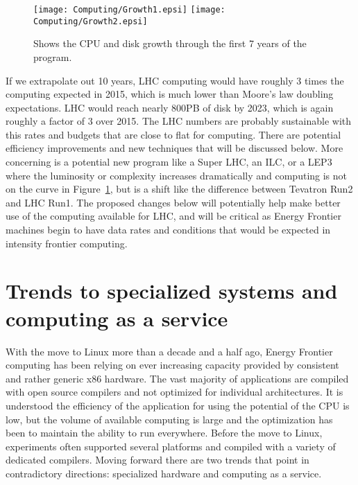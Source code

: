 \begin{figure}[htb]
\begin{center}
\texttt{[image: Computing/Growth1.epsi]}
\texttt{[image: Computing/Growth2.epsi]}
\caption{Shows the CPU and disk growth through the first 7 years of the program.}
\label{fig:growth}
\end{center}
\end{figure}



If we extrapolate out 10 years, LHC computing would have roughly 3 times the computing expected in 2015, 
which is much lower than Moore's law doubling expectations.    LHC would reach nearly 800PB of disk by 2023, 
which is again roughly a factor of 3 over 2015.    The LHC numbers are probably sustainable with this rates 
and budgets that are close to flat for computing.   There are potential efficiency improvements and new 
techniques that will be discussed below.    More concerning is a potential new program like a Super LHC, an ILC, or a 
LEP3 where the luminosity or complexity increases dramatically and computing is not on the curve in Figure~\ref{fig:growth},
 but is a shift like the difference between Tevatron Run2 and LHC Run1.    The proposed changes below will 
potentially help make better use of the computing available for LHC, and will be critical as Energy 
Frontier machines begin to have data rates and conditions that would be expected in intensity frontier computing.


\section{Trends to specialized systems and computing as a service}
\label{sec:comp-clouds}

With the move to Linux more than a decade and a half ago, Energy Frontier computing has been relying on ever increasing capacity provided by consistent and rather generic x86 hardware.    The vast majority of applications are compiled with open source compilers and not optimized for individual architectures.   It is understood the efficiency of the application for using the potential of the CPU is low, but the volume of available computing is large and the optimization has been to maintain the ability to run everywhere.  Before the move to Linux, experiments often supported several platforms and compiled with a variety of dedicated compilers.     Moving forward there are two trends that point in contradictory directions: specialized hardware and computing as a service. 

